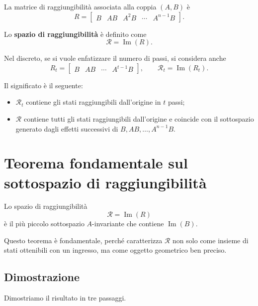La matrice di raggiungibilità associata alla coppia \((A,B)\) è
\begin{equation}
R=\begin{bmatrix}
B & AB & A^2B & \cdots & A^{n-1}B
\end{bmatrix}.
\end{equation}

Lo \textbf{spazio di raggiungibilità} è definito come
\begin{equation}
\mathcal{R}=\operatorname{Im}(R).
\end{equation}

Nel discreto, se si vuole enfatizzare il numero di passi, si considera anche
\begin{equation}
R_t=\begin{bmatrix}
B & AB & \cdots & A^{t-1}B
\end{bmatrix},
\qquad
\mathcal{R}_t=\operatorname{Im}(R_t).
\end{equation}

Il significato è il seguente:
\begin{itemize}
    \item \(\mathcal{R}_t\) contiene gli stati raggiungibili dall’origine in \(t\) passi;
    \item \(\mathcal{R}\) contiene tutti gli stati raggiungibili dall’origine e coincide con il sottospazio generato dagli effetti successivi di \(B,AB,\dots,A^{n-1}B\).
\end{itemize}

\section{Teorema fondamentale sul sottospazio di raggiungibilità}

\begin{teorema}
Lo spazio di raggiungibilità
\[
\mathcal{R}=\operatorname{Im}(R)
\]
è il più piccolo sottospazio \(A\)-invariante che contiene \(\operatorname{Im}(B)\).
\end{teorema}

Questo teorema è fondamentale, perché caratterizza \(\mathcal{R}\) non solo come insieme di stati ottenibili con un ingresso, ma come oggetto geometrico ben preciso.

\subsection{Dimostrazione}

Dimostriamo il risultato in tre passaggi.

